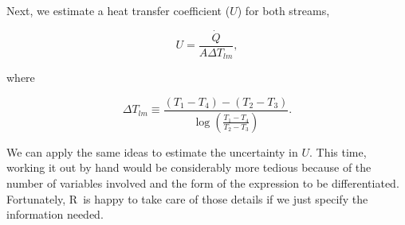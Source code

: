 \documentclass[twoside]{book}\usepackage[]{graphicx}\usepackage[]{xcolor}
\def\R{{\sf R}}
\begin{document}
Next, we estimate a heat transfer coefficient ($U$) for both streams,

\begin{equation}
    U = \frac{\dot{Q}}{A \Delta T_{lm}},
\end{equation}

\noindent{} where 

\begin{equation}
    \Delta T_{lm} \equiv \frac{(T_{1} - T_{4}) - (T_{2} - T_{3})}{\log\left( \frac{T_{1} - T_{4}}{T_{2} - T_{3}} \right)}.
\end{equation}

We can apply the same ideas to estimate the uncertainty in $U$.  This time,
working it out by hand would be considerably more tedious because of the number
of variables involved and the form of the expression to be differentiated.
Fortunately, \R\ is happy to take care of those details if we just specify the
information needed.
\end{document}
